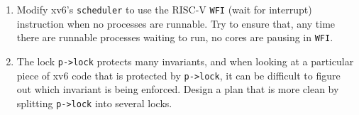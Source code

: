 \begin{enumerate}
\item Modify xv6's
\lstinline{scheduler}
to use the
RISC-V
\lstinline{WFI}
(wait for interrupt)
instruction
when no processes are runnable.
Try to ensure that, any time there are runnable processes waiting
to run, no cores are pausing in \texttt{WFI}.

\item The lock
\lstinline{p->lock}
protects many invariants, and when looking at a particular piece of xv6 code that
is protected by
\lstinline{p->lock},
it can be difficult to figure out which invariant is being enforced.  Design a
plan that is more clean by splitting
\lstinline{p->lock}
into several locks.

\end{enumerate}
